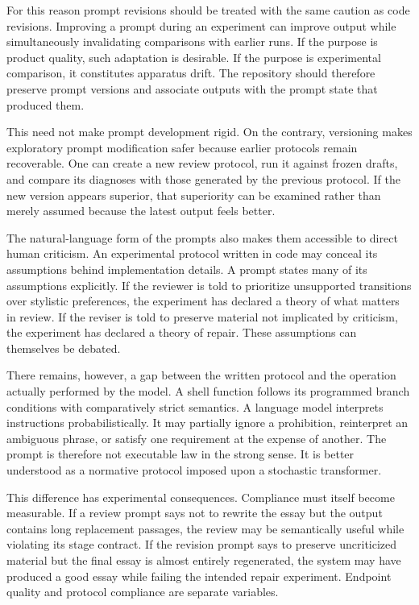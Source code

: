 \documentclass[11pt]{article}
\begin{document}
For this reason prompt revisions should be treated with the same caution as code revisions. Improving a prompt during an experiment can improve output while simultaneously invalidating comparisons with earlier runs. If the purpose is product quality, such adaptation is desirable. If the purpose is experimental comparison, it constitutes apparatus drift. The repository should therefore preserve prompt versions and associate outputs with the prompt state that produced them.

This need not make prompt development rigid. On the contrary, versioning makes exploratory prompt modification safer because earlier protocols remain recoverable. One can create a new review protocol, run it against frozen drafts, and compare its diagnoses with those generated by the previous protocol. If the new version appears superior, that superiority can be examined rather than merely assumed because the latest output feels better.

The natural-language form of the prompts also makes them accessible to direct human criticism. An experimental protocol written in code may conceal its assumptions behind implementation details. A prompt states many of its assumptions explicitly. If the reviewer is told to prioritize unsupported transitions over stylistic preferences, the experiment has declared a theory of what matters in review. If the reviser is told to preserve material not implicated by criticism, the experiment has declared a theory of repair. These assumptions can themselves be debated.

There remains, however, a gap between the written protocol and the operation actually performed by the model. A shell function follows its programmed branch conditions with comparatively strict semantics. A language model interprets instructions probabilistically. It may partially ignore a prohibition, reinterpret an ambiguous phrase, or satisfy one requirement at the expense of another. The prompt is therefore not executable law in the strong sense. It is better understood as a normative protocol imposed upon a stochastic transformer.

This difference has experimental consequences. Compliance must itself become measurable. If a review prompt says not to rewrite the essay but the output contains long replacement passages, the review may be semantically useful while violating its stage contract. If the revision prompt says to preserve uncriticized material but the final essay is almost entirely regenerated, the system may have produced a good essay while failing the intended repair experiment. Endpoint quality and protocol compliance are separate variables.
\end{document}
